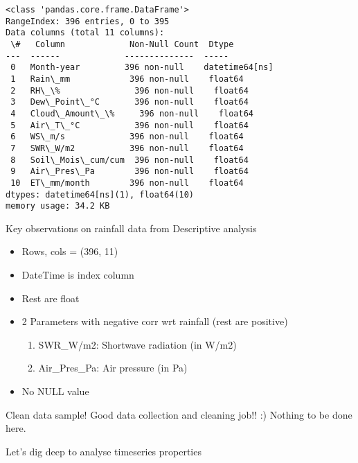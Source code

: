 \documentclass[11pt]{article}
\providecommand{\tightlist}{%
      \setlength{\itemsep}{0pt}\setlength{\parskip}{0pt}}
\begin{document}
    \begin{Verbatim}[commandchars=\\\{\}]
<class 'pandas.core.frame.DataFrame'>
RangeIndex: 396 entries, 0 to 395
Data columns (total 11 columns):
 \#   Column             Non-Null Count  Dtype
---  ------             --------------  -----
 0   Month-year         396 non-null    datetime64[ns]
 1   Rain\_mm            396 non-null    float64
 2   RH\_\%               396 non-null    float64
 3   Dew\_Point\_°C       396 non-null    float64
 4   Cloud\_Amount\_\%     396 non-null    float64
 5   Air\_T\_°C           396 non-null    float64
 6   WS\_m/s             396 non-null    float64
 7   SWR\_W/m2           396 non-null    float64
 8   Soil\_Mois\_cum/cum  396 non-null    float64
 9   Air\_Pres\_Pa        396 non-null    float64
 10  ET\_mm/month        396 non-null    float64
dtypes: datetime64[ns](1), float64(10)
memory usage: 34.2 KB
    \end{Verbatim}

    Key observations on rainfall data from Descriptive analysis

\begin{itemize}
\tightlist
\item
  Rows, cols = (396, 11)
\item
  DateTime is index column
\item
  Rest are float
\item
  2 Parameters with negative corr wrt rainfall (rest are positive)

  \begin{enumerate}
  \def\labelenumi{\arabic{enumi}.}
  \tightlist
  \item
    SWR\_W/m2: Shortwave radiation (in W/m2)
  \item
    Air\_Pres\_Pa: Air pressure (in Pa)
  \end{enumerate}
\item
  No NULL value
\end{itemize}

Clean data sample! Good data collection and cleaning job!! :) Nothing to
be done here.

    Let's dig deep to analyse timeseries properties
\end{document}
